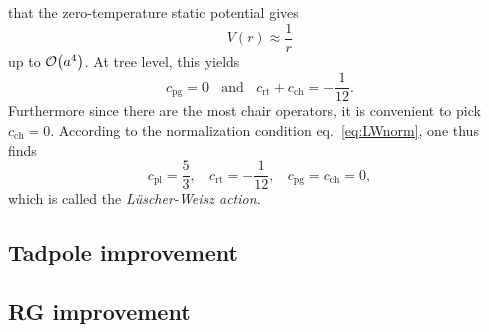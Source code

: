 that the zero-temperature static potential gives
\begin{equation}
  V(r)\approx\frac{1}{r}
\end{equation}
up to $\order{a^4}$. At tree level, this yields 
\begin{equation}
  c_\text{pg}=0~~~~\text{and}~~~~c_\text{rt}+c_\text{ch}=-\frac{1}{12}.
\end{equation}
Furthermore since there are the most chair operators, it is convenient
to pick $c_\text{ch}=0$. According to the normalization condition
eq.~\eqref{eq:LWnorm}, one thus finds
\begin{equation}
  c_\text{pl}=\frac{5}{3},~~~~c_\text{rt}=-\frac{1}{12},~~~~
    c_\text{pg}=c_\text{ch}=0,
\end{equation}
which is called the \it{L\"uscher-Weisz} action.

\subsection{Tadpole improvement}
\subsection{RG improvement}





